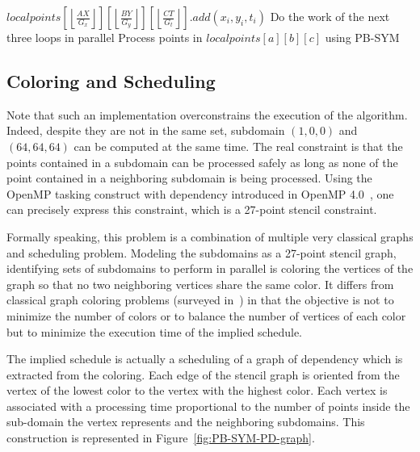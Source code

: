 \documentclass{article}
\newcommand{\floor}[1]{\left\lfloor #1 \right\rfloor}
\begin{document}
\begin{algorithm}
\caption{\textsc{PB-SYM-PD}}
\begin{algorithmic}
  \State $localpoints[\floor{\frac{A X}{G_x}}][\floor{\frac{B Y}{G_y}}][\floor{\frac{C T}{G_t}}].add(x_i,y_i,t_i)$
\EndFor
%
      \State Do the work of the next three loops in parallel
            \State Process points in $localpoints[a][b][c]$ using PB-SYM
          \EndFor
        \EndFor
      \EndFor
    \EndFor
  \EndFor
\EndFor
\end{algorithmic}
\label{alg:pb-sym-pd}
\end{algorithm}


\subsection{Coloring and Scheduling}

Note that such an implementation overconstrains the execution of the
algorithm. Indeed, despite they are not in the same set, subdomain $(1,
0, 0)$ and $(64, 64, 64)$ can be computed at the same time. The real
constraint is that the points contained in a subdomain can be
processed safely as long as none of the point contained in a
neighboring subdomain is being processed. Using the OpenMP tasking
construct with dependency introduced in OpenMP 4.0~\cite{OpenMP4}, one
can precisely express this constraint, which is a 27-point stencil
constraint.

Formally speaking, this problem is a combination of multiple very
classical graphs and scheduling problem. Modeling the subdomains as a
27-point stencil graph, identifying sets of subdomains to perform in
parallel is coloring the vertices of the graph so that no two
neighboring vertices share the same color. It differs from classical
graph coloring problems (surveyed in~\cite{GMP05}) in that the objective
is not to minimize the number of colors or to balance the number of
vertices of each color but to minimize the execution time of the
implied schedule.

The implied schedule is actually a scheduling of a graph of dependency
which is extracted from the coloring. Each edge of the stencil graph
is oriented from the vertex of the lowest color to the vertex with the
highest color. Each vertex is associated with a processing time 
proportional to the number of points inside the sub-domain
the vertex represents and the neighboring subdomains. This
construction is represented in Figure~\ref{fig:PB-SYM-PD-graph}.
\end{document}
